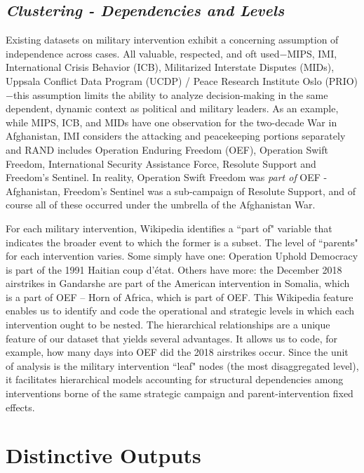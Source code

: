 \documentclass[fleqn,12pt]{article}
\begin{document}
\subsection*{\textit{Clustering - Dependencies and Levels}}
Existing datasets on military intervention exhibit a concerning assumption of independence across cases. All valuable, respected, and oft used$-$MIPS, IMI, International Crisis Behavior (ICB), Militarized Interstate Disputes (MIDs), Uppsala Conflict Data Program (UCDP) / Peace Research Institute Oslo (PRIO) $-$this assumption limits the ability to analyze decision-making in the same dependent, dynamic context as political and military leaders. As an example, while MIPS, ICB, and MIDs have one observation for the two-decade War in Afghanistan, IMI considers the attacking and peacekeeping portions separately and RAND includes Operation Enduring Freedom (OEF), Operation Swift Freedom, International Security Assistance Force, Resolute Support and Freedom's Sentinel. In reality, Operation Swift Freedom was \textit{part of} OEF - Afghanistan, Freedom's Sentinel was a sub-campaign of Resolute Support, and of course all of these occurred under the umbrella of the Afghanistan War.

For each military intervention, Wikipedia identifies a ``part of" variable that indicates the broader event to which the former is a subset. The level of ``parents" for each intervention varies. Some simply have one: Operation Uphold Democracy is part of the 1991 Haitian coup d'état. Others have more: the December 2018 airstrikes in Gandarshe are part of the American intervention in Somalia, which is a part of OEF – Horn of Africa, which is part of OEF. This Wikipedia feature enables us to identify and code the operational and strategic levels in which each intervention ought to be nested. The hierarchical relationships are a unique feature of our dataset that yields several advantages. It allows us to code, for example, how many days into OEF did the 2018 airstrikes occur. Since the unit of analysis is the military intervention ``leaf" nodes (the most disaggregated level), it facilitates hierarchical models accounting for structural dependencies among interventions borne of the same strategic campaign and parent-intervention fixed effects.

\section*{Distinctive Outputs}
\end{document}
